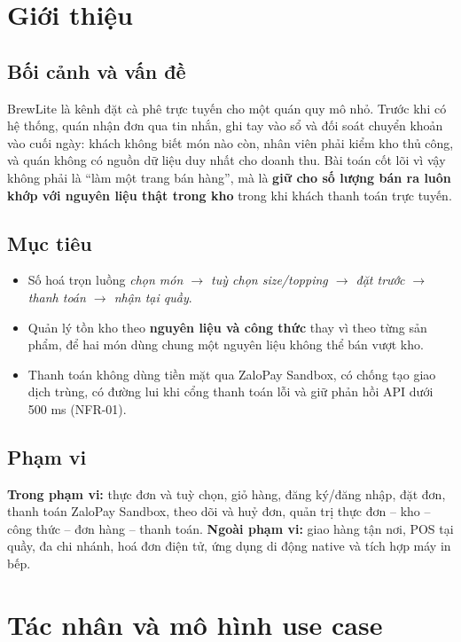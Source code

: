 ﻿\documentclass[12pt,a4paper]{article}
\begin{document}
\makecover

\section{Giới thiệu}

\subsection{Bối cảnh và vấn đề}
BrewLite là kênh đặt cà phê trực tuyến cho một quán quy mô nhỏ. Trước khi có hệ thống, quán nhận
đơn qua tin nhắn, ghi tay vào sổ và đối soát chuyển khoản vào cuối ngày: khách không biết món nào
còn, nhân viên phải kiểm kho thủ công, và quán không có nguồn dữ liệu duy nhất cho doanh thu. Bài
toán cốt lõi vì vậy không phải là ``làm một trang bán hàng'', mà là \textbf{giữ cho số lượng bán ra
luôn khớp với nguyên liệu thật trong kho} trong khi khách thanh toán trực tuyến.

\subsection{Mục tiêu}
\begin{itemize}
  \item Số hoá trọn luồng \emph{chọn món $\rightarrow$ tuỳ chọn size/topping $\rightarrow$ đặt trước
        $\rightarrow$ thanh toán $\rightarrow$ nhận tại quầy}.
  \item Quản lý tồn kho theo \textbf{nguyên liệu và công thức} thay vì theo từng sản phẩm, để hai món
        dùng chung một nguyên liệu không thể bán vượt kho.
  \item Thanh toán không dùng tiền mặt qua ZaloPay Sandbox, có chống tạo giao dịch trùng, có đường lui
        khi cổng thanh toán lỗi và giữ phản hồi API dưới 500 ms (NFR-01).
\end{itemize}

\subsection{Phạm vi}
\textbf{Trong phạm vi:} thực đơn và tuỳ chọn, giỏ hàng, đăng ký/đăng nhập, đặt đơn, thanh toán
ZaloPay Sandbox, theo dõi và huỷ đơn, quản trị thực đơn -- kho -- công thức -- đơn hàng -- thanh toán.
\textbf{Ngoài phạm vi:} giao hàng tận nơi, POS tại quầy, đa chi nhánh, hoá đơn điện tử, ứng dụng di
động native và tích hợp máy in bếp.

\section{Tác nhân và mô hình use case}
\end{document}
